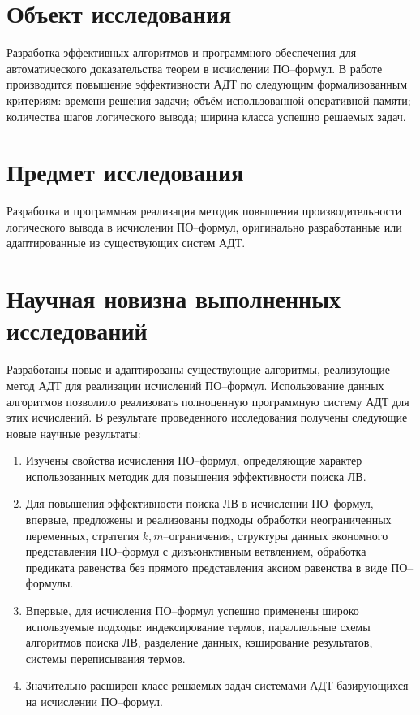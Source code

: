 \section*{Объект исследования}
Разработка эффективных алгоритмов и программного обеспечения для автоматического доказательства теорем в исчислении ПО--формул. В работе производится повышение эффективности АДТ по следующим формализованным критериям: времени решения задачи; объём использованной оперативной памяти; количества шагов логического вывода; ширина класса успешно решаемых задач. %


\section*{Предмет исследования}
Разработка и программная реализация методик повышения производительности логического вывода в исчислении ПО--формул, оригинально разработанные или адаптированные из существующих систем АДТ.

\section*{Научная новизна выполненных исследований}
Разработаны новые и адаптированы существующие алгоритмы, реализующие метод АДТ для реализации исчислений ПО--формул. Использование данных алгоритмов позволило реализовать полноценную программную систему АДТ для этих исчислений. В результате проведенного исследования получены следующие новые научные результаты:
\begin{enumerate}
\item Изучены свойства исчисления ПО--формул, определяющие характер использованных методик для повышения эффективности поиска ЛВ.
\item Для повышения эффективности поиска ЛВ в исчислении ПО--формул, впервые, предложены и реализованы подходы обработки неограниченных переменных, стратегия $k,m$--ограничения, структуры данных экономного представления ПО--формул с дизъюнктивным ветвлением, обработка предиката равенства без прямого представления аксиом равенства в виде ПО--формулы.
\item Впервые, для исчисления ПО--формул успешно применены широко используемые подходы: индексирование термов, параллельные схемы алгоритмов поиска ЛВ, разделение данных, кэширование результатов, системы переписывания термов.
\item Значительно расширен класс решаемых задач системами АДТ базирующихся на исчислении ПО--формул.
\end{enumerate}


